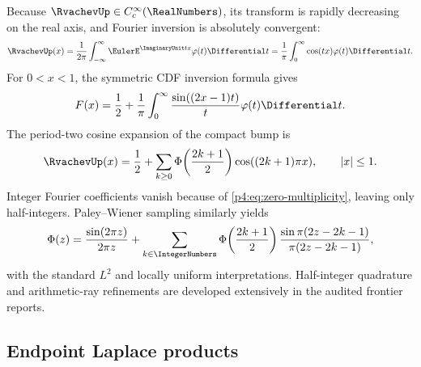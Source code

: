 \documentclass[11pt]{article}
\theoremstyle{definition}
\theoremstyle{remark}
\newcommand{\PhiF}{\Phi}
\newcommand{\phiF}{\varphi}
\begin{document}
Because \(\RvachevUp\in C_c^\infty(\RealNumbers)\), its transform is rapidly decreasing on the real
axis, and Fourier inversion is absolutely convergent:
\begin{equation}
 \RvachevUp(x)=\frac1{2\pi}\int_{-\infty}^{\infty}
 \EulerE^{\ImaginaryUnit tx}\phiF(t)\Differential t
 =\frac1\pi\int_0^\infty\cos(tx)\phiF(t)\Differential t.
 \label{p4:eq:up-fourier-inversion}
\end{equation}
For \(0<x<1\), the symmetric CDF inversion formula gives
\begin{equation}
 F(x)=\frac12+\frac1\pi\int_0^\infty
 \frac{\sin((2x-1)t)}{t}\phiF(t)\Differential t.
 \label{p4:eq:F-sine-inversion}
\end{equation}
The period-two cosine expansion of the compact bump is
\begin{equation}
 \RvachevUp(x)=\frac12+
 \sum_{k\ge0}\PhiF\!\left(\frac{2k+1}{2}\right)
 \cos((2k+1)\pi x),\qquad |x|\le1.
 \label{p4:eq:half-integer-cosine}
\end{equation}
Integer Fourier coefficients vanish because of \eqref{p4:eq:zero-multiplicity}, leaving
only half-integers.  Paley--Wiener sampling similarly yields
\begin{equation}
 \PhiF(z)=\frac{\sin(2\pi z)}{2\pi z}+
 \sum_{k\in\IntegerNumbers}\PhiF\!\left(\frac{2k+1}{2}\right)
 \frac{\sin\pi(2z-2k-1)}{\pi(2z-2k-1)},
 \label{p4:eq:shannon}
\end{equation}
with the standard \(L^2\) and locally uniform interpretations.  Half-integer
quadrature and arithmetic-ray refinements are developed extensively in the audited
frontier reports.

\subsection{Endpoint Laplace products}
\end{document}
